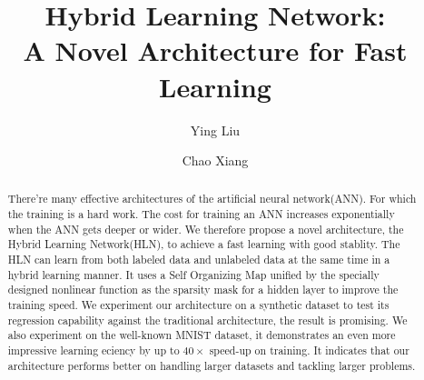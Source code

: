 \documentclass[3p,times,procedia]{elsarticle}
\begin{document}
\begin{frontmatter}




\title{Hybrid Learning Network:\\ 
	A Novel Architecture for
	Fast Learning}


\author[u1,u2]{Ying Liu}
\author[u1]{Chao Xiang}

\address[u1]{School of Computer 
	and Engineering, University of 
	Chinese Academy of Sciences, 
	Beijing, 100190 China}
\address[u2]{Key Lab of Big Data
	Mining and Knowledge Management,
	Chinese Academy of Sciences,
	Beijing, 100190 China}

\begin{abstract}
There're many effective architectures 
of the artificial neural network(ANN).
For which the training is a hard work.
The cost for training an ANN increases
exponentially when the ANN gets deeper 
or wider. 
We therefore propose a novel 
architecture, the Hybrid Learning
Network(HLN), to achieve a fast learning 
with good stablity.
The HLN can learn from both
labeled data and unlabeled data
at the same time in a hybrid
learning manner.
It uses a Self Organizing Map unified
by the specially designed nonlinear
function as the sparsity mask 
for a hidden layer to improve 
the training speed.
We experiment our architecture on 
a synthetic dataset to test its 
regression capability against the
traditional architecture, the result 
is promising.
We also experiment on the well-known
MNIST dataset, it demonstrates an 
even more impressive learning eciency 
by up to $40\times$ speed-up on training.
It indicates that our architecture performs
better on handling larger datasets and 
tackling larger problems.
\end{abstract}


\end{frontmatter}
\end{document}
